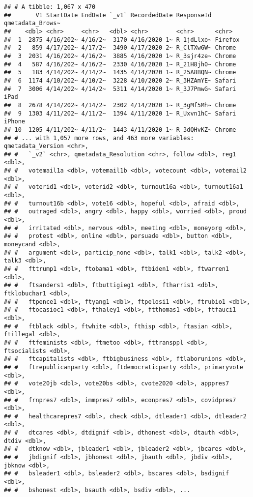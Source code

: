 \documentclass[
]{article}
\begin{document}
\begin{verbatim}
## # A tibble: 1,067 x 470
##       V1 StartDate EndDate `_v1` RecordedDate ResponseId qmetadata_Brows~
##    <dbl> <chr>     <chr>   <dbl> <chr>        <chr>      <chr>           
##  1  2875 4/16/202~ 4/16/2~  3170 4/16/2020 1~ R_1jdLlxo~ Firefox         
##  2   859 4/17/202~ 4/17/2~  3490 4/17/2020 2~ R_ClTXw6W~ Chrome          
##  3  2031 4/16/202~ 4/16/2~  3885 4/16/2020 1~ R_3sjr4ze~ Chrome          
##  4   587 4/16/202~ 4/16/2~  2330 4/16/2020 1~ R_21H8jh0~ Chrome          
##  5   183 4/14/202~ 4/14/2~  1435 4/14/2020 1~ R_25A8BQN~ Chrome          
##  6  1174 4/10/202~ 4/10/2~  3228 4/10/2020 2~ R_3HZAmYE~ Safari          
##  7  3006 4/14/202~ 4/14/2~  5311 4/14/2020 1~ R_3J7PmwG~ Safari iPad     
##  8  2678 4/14/202~ 4/14/2~  2302 4/14/2020 1~ R_3gMf5Mh~ Chrome          
##  9  1303 4/11/202~ 4/11/2~  1394 4/11/2020 1~ R_Uxvn1hC~ Safari iPhone   
## 10  1205 4/11/202~ 4/11/2~  1443 4/11/2020 1~ R_3dQHvKZ~ Chrome          
## # ... with 1,057 more rows, and 463 more variables: qmetadata_Version <chr>,
## #   `_v2` <chr>, qmetadata_Resolution <chr>, follow <dbl>, reg1 <dbl>,
## #   votemail1a <dbl>, votemail1b <dbl>, votecount <dbl>, votemail2 <dbl>,
## #   voterid1 <dbl>, voterid2 <dbl>, turnout16a <dbl>, turnout16a1 <dbl>,
## #   turnout16b <dbl>, vote16 <dbl>, hopeful <dbl>, afraid <dbl>,
## #   outraged <dbl>, angry <dbl>, happy <dbl>, worried <dbl>, proud <dbl>,
## #   irritated <dbl>, nervous <dbl>, meeting <dbl>, moneyorg <dbl>,
## #   protest <dbl>, online <dbl>, persuade <dbl>, button <dbl>, moneycand <dbl>,
## #   argument <dbl>, particip_none <dbl>, talk1 <dbl>, talk2 <dbl>, talk3 <dbl>,
## #   fttrump1 <dbl>, ftobama1 <dbl>, ftbiden1 <dbl>, ftwarren1 <dbl>,
## #   ftsanders1 <dbl>, ftbuttigieg1 <dbl>, ftharris1 <dbl>, ftklobuchar1 <dbl>,
## #   ftpence1 <dbl>, ftyang1 <dbl>, ftpelosi1 <dbl>, ftrubio1 <dbl>,
## #   ftocasioc1 <dbl>, fthaley1 <dbl>, ftthomas1 <dbl>, ftfauci1 <dbl>,
## #   ftblack <dbl>, ftwhite <dbl>, fthisp <dbl>, ftasian <dbl>, ftillegal <dbl>,
## #   ftfeminists <dbl>, ftmetoo <dbl>, fttransppl <dbl>, ftsocialists <dbl>,
## #   ftcapitalists <dbl>, ftbigbusiness <dbl>, ftlaborunions <dbl>,
## #   ftrepublicanparty <dbl>, ftdemocraticparty <dbl>, primaryvote <dbl>,
## #   vote20jb <dbl>, vote20bs <dbl>, cvote2020 <dbl>, apppres7 <dbl>,
## #   frnpres7 <dbl>, immpres7 <dbl>, econpres7 <dbl>, covidpres7 <dbl>,
## #   healthcarepres7 <dbl>, check <dbl>, dtleader1 <dbl>, dtleader2 <dbl>,
## #   dtcares <dbl>, dtdignif <dbl>, dthonest <dbl>, dtauth <dbl>, dtdiv <dbl>,
## #   dtknow <dbl>, jbleader1 <dbl>, jbleader2 <dbl>, jbcares <dbl>,
## #   jbdignif <dbl>, jbhonest <dbl>, jbauth <dbl>, jbdiv <dbl>, jbknow <dbl>,
## #   bsleader1 <dbl>, bsleader2 <dbl>, bscares <dbl>, bsdignif <dbl>,
## #   bshonest <dbl>, bsauth <dbl>, bsdiv <dbl>, ...
\end{verbatim}
\end{document}
